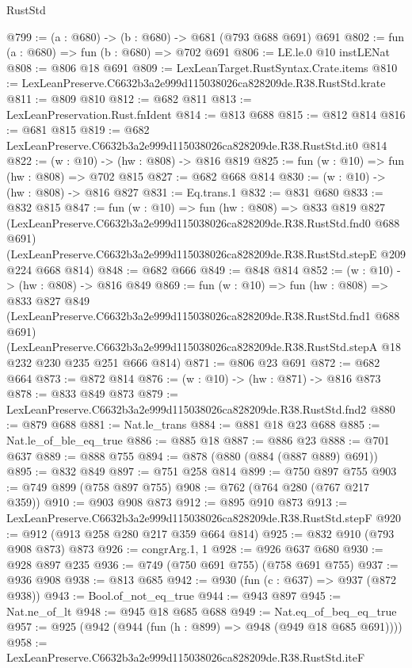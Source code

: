 \begin{lexlean}{RustStd}
\begin{coremodule}
@799 := (a : @680) -> (b : @680) -> @681 (@793 @688 @691) @691
@802 := fun (a : @680) => fun (b : @680) => @702 @691
@806 := LE.le.{0} @10 instLENat
@808 := @806 @18 @691
@809 := LexLeanTarget.RustSyntax.Crate.items
@810 := LexLeanPreserve.C6632b3a2e999d115038026ca828209de.R38.RustStd.krate
@811 := @809 @810
@812 := @682 @811
@813 := LexLeanPreservation.Rust.fnIdent
@814 := @813 @688
@815 := @812 @814
@816 := @681 @815
@819 := @682 LexLeanPreserve.C6632b3a2e999d115038026ca828209de.R38.RustStd.it0 @814
@822 := (w : @10) -> (hw : @808) -> @816 @819
@825 := fun (w : @10) => fun (hw : @808) => @702 @815
@827 := @682 @668 @814
@830 := (w : @10) -> (hw : @808) -> @816 @827
@831 := Eq.trans.{1}
@832 := @831 @680
@833 := @832 @815
@847 := fun (w : @10) =>
  fun (hw : @808) =>
  @833
    @819
    @827
    (LexLeanPreserve.C6632b3a2e999d115038026ca828209de.R38.RustStd.fnd0 @688 @691)
    (LexLeanPreserve.C6632b3a2e999d115038026ca828209de.R38.RustStd.stepE @209 @224 @668 @814)
@848 := @682 @666
@849 := @848 @814
@852 := (w : @10) -> (hw : @808) -> @816 @849
@869 := fun (w : @10) =>
  fun (hw : @808) =>
  @833
    @827
    @849
    (LexLeanPreserve.C6632b3a2e999d115038026ca828209de.R38.RustStd.fnd1 @688 @691)
    (LexLeanPreserve.C6632b3a2e999d115038026ca828209de.R38.RustStd.stepA
      @18
      @232
      @230
      @235
      @251
      @666
      @814)
@871 := @806 @23 @691
@872 := @682 @664
@873 := @872 @814
@876 := (w : @10) -> (hw : @871) -> @816 @873
@878 := @833 @849 @873
@879 := LexLeanPreserve.C6632b3a2e999d115038026ca828209de.R38.RustStd.fnd2
@880 := @879 @688
@881 := Nat.le_trans
@884 := @881 @18 @23 @688
@885 := Nat.le_of_ble_eq_true
@886 := @885 @18
@887 := @886 @23
@888 := @701 @637
@889 := @888 @755
@894 := @878 (@880 (@884 (@887 @889) @691))
@895 := @832 @849
@897 := @751 @258 @814
@899 := @750 @897 @755
@903 := @749 @899 (@758 @897 @755)
@908 := @762 (@764 @280 (@767 @217 @359))
@910 := @903 @908 @873
@912 := @895 @910 @873
@913 := LexLeanPreserve.C6632b3a2e999d115038026ca828209de.R38.RustStd.stepF
@920 := @912 (@913 @258 @280 @217 @359 @664 @814)
@925 := @832 @910 (@793 @908 @873) @873
@926 := congrArg.{1, 1}
@928 := @926 @637 @680
@930 := @928 @897 @235
@936 := @749 (@750 @691 @755) (@758 @691 @755)
@937 := @936 @908
@938 := @813 @685
@942 := @930 (fun (c : @637) => @937 (@872 @938))
@943 := Bool.of_not_eq_true
@944 := @943 @897
@945 := Nat.ne_of_lt
@948 := @945 @18 @685 @688
@949 := Nat.eq_of_beq_eq_true
@957 := @925 (@942 (@944 (fun (h : @899) => @948 (@949 @18 @685 @691))))
@958 := LexLeanPreserve.C6632b3a2e999d115038026ca828209de.R38.RustStd.iteF

\end{coremodule}
\end{lexlean}
